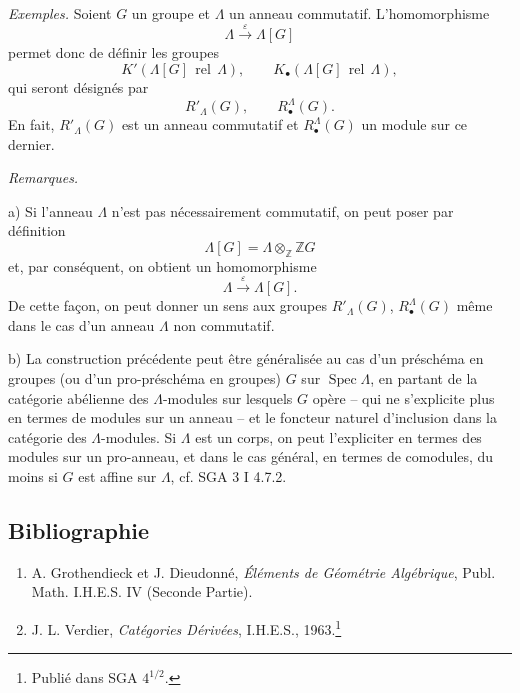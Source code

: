 \documentclass[11pt]{article}
\DeclareMathOperator{\Spec}{Spec}
\providecommand{\Spec}{\operatorname{Spec}}
\providecommand{\Spec}{\operatorname{Spec}}
\begin{document}
\emph{Exemples.} Soient $G$ un groupe et $\Lambda$ un anneau commutatif. L'homomorphisme
\[
\Lambda\xrightarrow{\varepsilon}\Lambda[G]
\]
permet donc de définir les groupes
\[
K'(\Lambda[G]\operatorname{\,rel\,}\Lambda),\qquad
K_\bullet(\Lambda[G]\operatorname{\,rel\,}\Lambda),
\]
qui seront désignés par
\[
R'_\Lambda(G),\qquad R^\Lambda_\bullet(G).
\]
En fait, $R'_\Lambda(G)$ est un anneau commutatif et $R^\Lambda_\bullet(G)$ un module sur ce dernier.

\emph{Remarques.}

a) Si l'anneau $\Lambda$ n'est pas nécessairement commutatif, on peut poser par définition
\[
\Lambda[G]=\Lambda\otimes_{\mathbb Z}\mathbb ZG
\]
et, par conséquent, on obtient un homomorphisme
\[
\Lambda\xrightarrow{\varepsilon}\Lambda[G].
\]
De cette façon, on peut donner un sens aux groupes $R'_\Lambda(G)$, $R^\Lambda_\bullet(G)$ même dans le cas d'un anneau $\Lambda$ non commutatif.

b) La construction précédente peut être généralisée au cas d'un préschéma en groupes (ou d'un pro-préschéma en groupes) $G$ sur $\Spec\Lambda$, en partant de la catégorie abélienne des $\Lambda$-modules sur lesquels $G$ opère -- qui ne s'explicite plus en termes de modules sur un anneau -- et le foncteur naturel d'inclusion dans la catégorie des $\Lambda$-modules. Si $\Lambda$ est un corps, on peut l'expliciter en termes des modules sur un pro-anneau, et dans le cas général, en termes de comodules, du moins si $G$ est affine sur $\Lambda$, cf. SGA 3 I 4.7.2.

\subsection*{Bibliographie}

\begin{enumerate}
\item[{[1]}] A. Grothendieck et J. Dieudonné, \emph{Éléments de Géométrie Algébrique}, Publ. Math. I.H.E.S. IV (Seconde Partie).
\item[{[2]}] J. L. Verdier, \emph{Catégories Dérivées}, I.H.E.S., 1963.\footnote{Publié dans SGA $4^{1/2}$.}
\end{enumerate}
\end{document}
